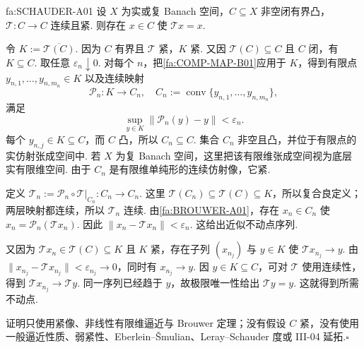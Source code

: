 \begin{FATheorem}{fa:SCHAUDER-A01}
设 \(\displaystyle X\) 为实或复 Banach 空间，\(\displaystyle C\subseteq X\) 非空闭有界凸，\(\displaystyle \mathcal T:C\to C\) 连续且紧. 则存在 \(\displaystyle x\in C\) 使 \(\displaystyle \mathcal T x=x\).
\end{FATheorem}

\begin{FAProof}
令
\(\displaystyle K:=\overline{\mathcal T(C)}.\)
因为 \(\displaystyle C\) 有界且 \(\displaystyle \mathcal T\) 紧，\(\displaystyle K\) 紧. 又因 \(\displaystyle \mathcal T(C)\subseteq C\) 且 \(\displaystyle C\) 闭，有 \(\displaystyle K\subseteq C\). 取任意 \(\displaystyle \varepsilon_n\downarrow0\). 对每个 \(\displaystyle n\)，把\autoref{fa:COMP-MAP-B01}应用于 \(\displaystyle K\)，得到有限点
\(\displaystyle y_{n,1},\dots,y_{n,m_n}\in K\)
以及连续映射
\[
\mathcal P_n:K\to C_n,
\quad
C_n:=\operatorname{conv}\{y_{n,1},\dots,y_{n,m_n}\},
\]
满足
\[
\sup_{y\in K}\|\mathcal P_n(y)-y\|<\varepsilon_n.
\]
每个 \(\displaystyle y_{n,j}\in K\subseteq C\)，而 \(\displaystyle C\) 凸，所以 \(\displaystyle C_n\subseteq C\). 集合 \(\displaystyle C_n\) 非空且凸，并位于有限点的实仿射张成空间中. 若 \(\displaystyle X\) 为复 Banach 空间，这里把该有限维张成空间视为底层实有限维空间. 由于 \(\displaystyle C_n\) 是有限维单纯形的连续仿射像，它紧.

定义
\(\displaystyle \mathcal T_n := \mathcal P_n\circ\mathcal T|_{C_n} : C_n\to C_n.\)
这里 \(\displaystyle \mathcal T(C_n)\subseteq\mathcal T(C)\subseteq K\)，所以复合良定义；两层映射都连续，所以 \(\displaystyle \mathcal T_n\) 连续. 由\autoref{fa:BROUWER-A01}，存在 \(\displaystyle x_n\in C_n\) 使
\(\displaystyle x_n = \mathcal P_n(\mathcal T x_n).\)
因此
\(\displaystyle \|x_n-\mathcal T x_n\| < \varepsilon_n.\)
这给出近似不动点序列.

又因为 \(\displaystyle \mathcal T x_n\in\mathcal T(C)\subseteq K\) 且 \(\displaystyle K\) 紧，存在子列 \(\displaystyle (x_{n_j})\) 与 \(\displaystyle y\in K\) 使
\(\displaystyle \mathcal T x_{n_j}\to y.\)
由 \(\displaystyle \|x_{n_j}-\mathcal T x_{n_j}\|<\varepsilon_{n_j}\to0\)，同时有 \(\displaystyle x_{n_j}\to y\). 因 \(\displaystyle y\in K\subseteq C\)，可对 \(\displaystyle \mathcal T\) 使用连续性，得到
\(\displaystyle \mathcal T x_{n_j}\to\mathcal T y.\)
同一序列已经趋于 \(\displaystyle y\)，故极限唯一性给出 \(\displaystyle \mathcal T y=y\). 这就得到所需不动点.

证明只使用紧像、非线性有限维逼近与 Brouwer 定理；没有假设 \(\displaystyle C\) 紧，没有使用一般逼近性质、弱紧性、Eberlein--Šmulian、Leray--Schauder 度或 III-04 延拓.\hfill\(\square\)

\end{FAProof}

